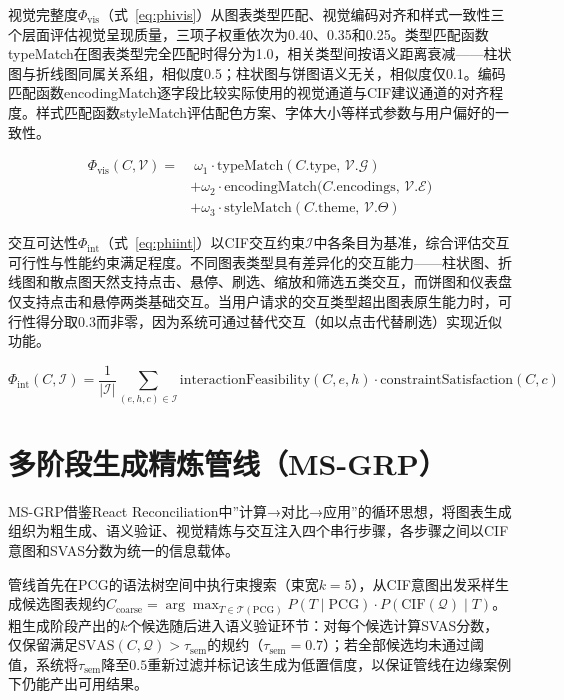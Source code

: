 视觉完整度$\Phi_{\text{vis}}$（式~\ref{eq:phivis}）从图表类型匹配、视觉编码对齐和样式一致性三个层面评估视觉呈现质量，三项子权重依次为0.40、0.35和0.25。类型匹配函数typeMatch在图表类型完全匹配时得分为1.0，相关类型间按语义距离衰减——柱状图与折线图同属关系组，相似度0.5；柱状图与饼图语义无关，相似度仅0.1。编码匹配函数encodingMatch逐字段比较实际使用的视觉通道与CIF建议通道的对齐程度。样式匹配函数styleMatch评估配色方案、字体大小等样式参数与用户偏好的一致性。

\begin{equation}\label{eq:phivis}
    \begin{aligned}
    \Phi_{\text{vis}}(C, \mathcal{V}) =
        &\; \omega_1 \cdot \text{typeMatch}(C.\text{type},\, \mathcal{V}.\mathcal{G}) \\
        &+ \omega_2 \cdot \text{encodingMatch}\big(C.\text{encodings},\, \mathcal{V}.\mathcal{E}\big) \\
        &+ \omega_3 \cdot \text{styleMatch}(C.\text{theme},\, \mathcal{V}.\Theta)
    \end{aligned}
\end{equation}

交互可达性$\Phi_{\text{int}}$（式~\ref{eq:phiint}）以CIF交互约束$\mathcal{I}$中各条目为基准，综合评估交互可行性与性能约束满足程度。不同图表类型具有差异化的交互能力——柱状图、折线图和散点图天然支持点击、悬停、刷选、缩放和筛选五类交互，而饼图和仪表盘仅支持点击和悬停两类基础交互。当用户请求的交互类型超出图表原生能力时，可行性得分取0.3而非零，因为系统可通过替代交互（如以点击代替刷选）实现近似功能。

\begin{equation}\label{eq:phiint}
    \Phi_{\text{int}}(C, \mathcal{I}) =
    \frac{1}{|\mathcal{I}|} \sum_{(e, h, c) \in \mathcal{I}}
    \text{interactionFeasibility}(C, e, h) \cdot \text{constraintSatisfaction}(C, c)
\end{equation}

\section{多阶段生成精炼管线（MS-GRP）}
\label{sec:msgrp}

MS-GRP借鉴React Reconciliation中”计算→对比→应用”的循环思想，将图表生成组织为粗生成、语义验证、视觉精炼与交互注入四个串行步骤，各步骤之间以CIF意图和SVAS分数为统一的信息载体。

管线首先在PCG的语法树空间中执行束搜索（束宽$k=5$），从CIF意图出发采样生成候选图表规约$C_{\text{coarse}} = \arg\max_{T \in \mathcal{T}(\text{PCG})} P(T \mid \text{PCG}) \cdot P(\text{CIF}(\mathcal{Q}) \mid T)$。粗生成阶段产出的$k$个候选随后进入语义验证环节：对每个候选计算SVAS分数，仅保留满足$\text{SVAS}(C, \mathcal{Q}) > \tau_{\text{sem}}$的规约（$\tau_{\text{sem}} = 0.7$）；若全部候选均未通过阈值，系统将$\tau_{\text{sem}}$降至$0.5$重新过滤并标记该生成为低置信度，以保证管线在边缘案例下仍能产出可用结果。

